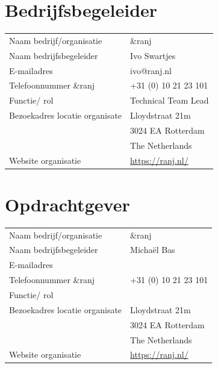 \documentclass{report}
\newcommand{\organisation}{\&ranj }
\begin{document}
\section*{Bedrijfsbegeleider}
\begin{table}[h]
\begin{tabular}{ll}
Naam bedrijf/organisatie & \organisation \\
Naam bedrijfsbegeleider & Ivo Swartjes \\
E-mailadres & ivo@ranj.nl \\
Telefoonnummer \organisation & +31 (0) 10 21 23 101 \\
Functie/ rol & Technical Team Lead \\
Bezoekadres locatie organisate & Lloydstraat 21m \\ 
 & 3024 EA Rotterdam \\
 & The Netherlands \\
Website organisatie & \url{https://ranj.nl/}
\end{tabular}
\end{table}

\section*{Opdrachtgever}
\begin{table}[h]
\begin{tabular}{ll}
Naam bedrijf/organisatie & \organisation \\
Naam bedrijfsbegeleider & Micha{\"e}l Bas \\
E-mailadres &  \\
Telefoonnummer \organisation & +31 (0) 10 21 23 101 \\
Functie/ rol &  \\
Bezoekadres locatie organisate & Lloydstraat 21m \\ 
 & 3024 EA Rotterdam \\
 & The Netherlands \\
Website organisatie & \url{https://ranj.nl/}
\end{tabular}
\end{table}
\end{document}
